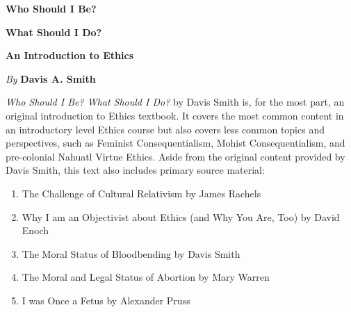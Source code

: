 \thispagestyle{empty}

\pagestyle{empty}

\vspace*{80pt}

\begin{raggedleft}
\fontsize{30pt}{24pt}\sffamily
\selectfont
  \textbf{Who Should I Be?}
  
  \textbf{What Should I Do?}

\medskip\fontsize{18pt}{20pt}\selectfont

\textbf{An Introduction to Ethics}

\vfill
\fontsize{12pt}{16pt}\selectfont \textit{By }  \textbf{Davis A. Smith}\\
\end{raggedleft}

\newpage

\noindent\fontsize{12pt}{16pt}\selectfont
\emph{Who Should I Be? What Should I Do?} by Davis Smith is, for the most part, an original introduction to Ethics textbook. It covers the most common content in an introductory level Ethics course but also covers less common topics and perspectives, such as Feminist Consequentialism, Mohist Consequentialism, and pre-colonial Nahuatl Virtue Ethics. Aside from the original content provided by Davis Smith, this text also includes primary source material:

\begin{enumerate}
\item The Challenge of Cultural Relativism by James Rachels
\item Why I am an Objectivist about Ethics (and Why You Are, Too) by David Enoch
\item The Moral Status of Bloodbending by Davis Smith
\item The Moral and Legal Status of Abortion by Mary Warren
\item I was Once a Fetus by Alexander Pruss
\end{enumerate}

